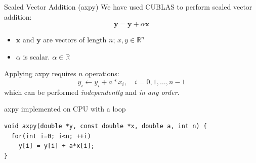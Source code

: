 \documentclass[aspectratio=43]{beamer}
\newcommand{\axpy}{{\ttfamily axpy}\xspace}
\begin{document}
\begin{frame}[fragile]{Scaled Vector Addition (\axpy)}
    We have used CUBLAS to perform scaled vector addition:
        $$\mathbf{y} = \mathbf{y} + \alpha \mathbf{x}$$
        \vspace{-15pt}
    \begin{itemize}
        \item $\mathbf{x}$ and $\mathbf{y}$ are vectors of length $n$; \hfill $x,y \in \mathbb{R}^n$
        \item $\alpha$ is scalar. \hfill $\alpha\in\mathbb{R}$
    \end{itemize}
    Applying \axpy requires $n$ operations:
    $$y_i \leftarrow y_i + a*x_i,\quad i = {0, 1, \dots, n-1}$$
    which can be performed \emph{independently} and \emph{in any order}.

    \begin{code}{\axpy implemented on CPU with a loop}
        \begin{lstlisting}[style=boxcuda]
void axpy(double *y, const double *x, double a, int n) {
  for(int i=0; i<n; ++i)
    y[i] = y[i] + a*x[i];
}
        \end{lstlisting}
    \end{code}

\end{frame}
\end{document}

